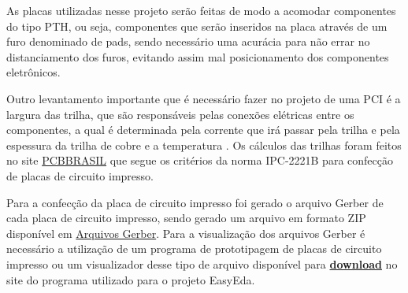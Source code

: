 \par As placas utilizadas nesse projeto serão feitas de modo a acomodar componentes do tipo PTH, ou seja, componentes que serão inseridos na placa através de um furo denominado de pads, sendo necessário uma acurácia para não errar no distanciamento dos furos, evitando assim mal posicionamento dos componentes eletrônicos.
\par Outro levantamento importante que é necessário fazer no projeto de uma PCI é a largura das trilha, que são responsáveis pelas conexões elétricas entre os componentes, a qual é determinada pela corrente que irá passar pela trilha e pela espessura da trilha de cobre  e a temperatura \cite{ TecnicasdeProjetosPCI}. Os cálculos das trilhas foram feitos no site \href{https://pcbbrasil.com.br/calculo-trilha-pcb.php}{PCBBRASIL} que segue os critérios da norma IPC-2221B para confecção de placas de circuito impresso.
\par Para a confecção da placa de circuito impresso foi gerado o arquivo Gerber de cada placa de circuito impresso, sendo gerado um arquivo em formato ZIP disponível em \href{https://drive.google.com/drive/folders/1P1pQGE_zuSLOB5qd8zfESWqLDwtyoRKd?usp=sharing}{ Arquivos Gerber}. Para a visualização dos arquivos Gerber é necessário a utilização de um programa de prototipagem de placas de circuito impresso ou um visualizador desse tipo de arquivo disponível para \href{https://sourceforge.net/projects/gerbv/files/}{ \textbf{download}} no site do programa utilizado para o projeto EasyEda.

